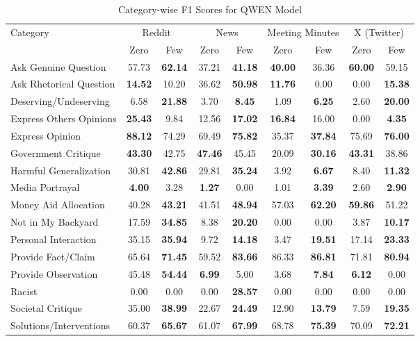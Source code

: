 \begin{table*}[htbp]
\centering
\begin{tabular}{l *{8}{c}}
\toprule
Category & \multicolumn{2}{c}{Reddit} & \multicolumn{2}{c}{News} & \multicolumn{2}{c}{Meeting Minutes} & \multicolumn{2}{c}{X (Twitter)} \\
& Zero & Few & Zero & Few & Zero & Few & Zero & Few \\
\midrule
Ask Genuine Question & 57.73 & \textbf{62.14} & 37.21 & \textbf{41.18} & \textbf{40.00} & 36.36 & \textbf{60.00} & 59.15 \\
Ask Rhetorical Question & \textbf{14.52} & 10.20 & 36.62 & \textbf{50.98} & \textbf{11.76} & 0.00 & 0.00 & \textbf{15.38} \\
Deserving/Undeserving & 6.58 & \textbf{21.88} & 3.70 & \textbf{8.45} & 1.09 & \textbf{6.25} & 2.60 & \textbf{20.00} \\
Express Others Opinions & \textbf{25.43} & 9.84 & 12.56 & \textbf{17.02} & \textbf{16.84} & 16.00 & 0.00 & \textbf{4.35} \\
Express Opinion & \textbf{88.12} & 74.29 & 69.49 & \textbf{75.82} & 35.37 & \textbf{37.84} & 75.69 & \textbf{76.00} \\
Government Critique & \textbf{43.30} & 42.75 & \textbf{47.46} & 45.45 & 20.09 & \textbf{30.16} & \textbf{43.31} & 38.86 \\
Harmful Generalization & 30.81 & \textbf{42.86} & 29.81 & \textbf{35.24} & 3.92 & \textbf{6.67} & 8.40 & \textbf{11.32} \\
Media Portrayal & \textbf{4.00} & 3.28 & \textbf{1.27} & 0.00 & 1.01 & \textbf{3.39} & 2.60 & \textbf{2.90} \\
Money Aid Allocation & 40.28 & \textbf{43.21} & 41.51 & \textbf{48.94} & 57.03 & \textbf{62.20} & \textbf{59.86} & 51.22 \\
Not in My Backyard & 17.59 & \textbf{34.85} & 8.38 & \textbf{20.20} & 0.00 & 0.00 & 3.87 & \textbf{10.17} \\
Personal Interaction & 35.15 & \textbf{35.94} & 9.72 & \textbf{14.18} & 3.47 & \textbf{19.51} & 17.14 & \textbf{23.33} \\
Provide Fact/Claim & 65.64 & \textbf{71.45} & 59.52 & \textbf{83.66} & 86.33 & \textbf{86.81} & 71.81 & \textbf{80.94} \\
Provide Observation & 45.48 & \textbf{54.44} & \textbf{6.99} & 5.00 & 3.68 & \textbf{7.84} & \textbf{6.12} & 0.00 \\
Racist & 0.00 & 0.00 & 0.00 & \textbf{28.57} & 0.00 & 0.00 & 0.00 & 0.00 \\
Societal Critique & 35.00 & \textbf{38.99} & 22.67 & \textbf{24.49} & 12.90 & \textbf{13.79} & 7.59 & \textbf{19.35} \\
Solutions/Interventions & 60.37 & \textbf{65.67} & 61.07 & \textbf{67.99} & 68.78 & \textbf{75.39} & 70.09 & \textbf{72.21} \\
\bottomrule
\end{tabular}
\caption{Category-wise F1 Scores for QWEN Model}
\label{tab:qwen_category_breakdown}
\end{table*}